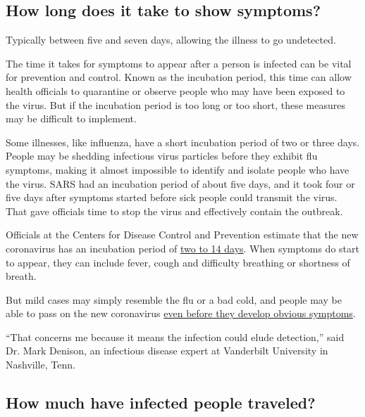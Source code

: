 \hypertarget{how-long-does-it-take-to-show-symptoms}{%
\subsection{How long does it take to show
symptoms?}\label{how-long-does-it-take-to-show-symptoms}}

Typically between five and seven days, allowing the illness to go
undetected.

The time it takes for symptoms to appear after a person is infected can
be vital for prevention and control. Known as the incubation period,
this time can allow health officials to quarantine or observe people who
may have been exposed to the virus. But if the incubation period is too
long or too short, these measures may be difficult to implement.

Some illnesses, like influenza, have a short incubation period of two or
three days. People may be shedding infectious virus particles before
they exhibit flu symptoms, making it almost impossible to identify and
isolate people who have the virus. SARS had an incubation period of
about five days, and it took four or five days after symptoms started
before sick people could transmit the virus. That gave officials time to
stop the virus and effectively contain the outbreak.

Officials at the Centers for Disease Control and Prevention estimate
that the new coronavirus has an incubation period of
\href{https://www.cdc.gov/coronavirus/2019-ncov/about/symptoms.html}{two
to 14 days}. When symptoms do start to appear, they can include fever,
cough and difficulty breathing or shortness of breath.

But mild cases may simply resemble the flu or a bad cold, and people may
be able to pass on the new coronavirus
\href{https://www.nytimes3xbfgragh.onion/2020/02/26/health/coronavirus-asymptomatic.html}{even
before they develop obvious symptoms}.

``That concerns me because it means the infection could elude
detection,'' said Dr. Mark Denison, an infectious disease expert at
Vanderbilt University in Nashville, Tenn.

\hypertarget{how-much-have-infected-people-traveled}{%
\subsection{How much have infected people
traveled?}\label{how-much-have-infected-people-traveled}}


